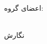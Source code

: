 \begin{center}
{اعضای گروه:}\\[.5em]

\ThesisGroupNameI \\
\ThesisGroupNameII

\vspace{2cm}

{نگارش}\\[.5em]
{\large\textbf{\ThesisAuthor}}

\vspace{1cm}



\ThesisDate

\end{center}

\newpage
